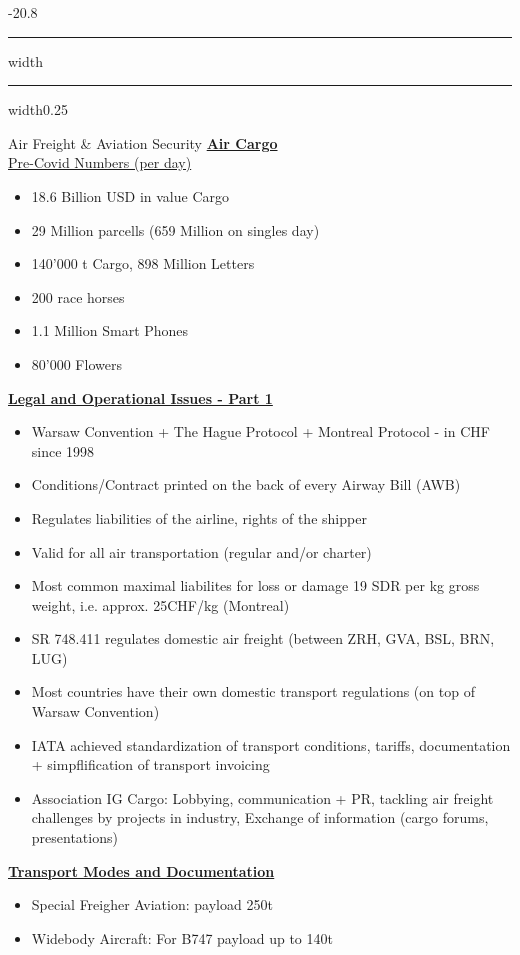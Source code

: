 \documentclass[9pt, landscape, fleqn]{scrartcl}
\makeatletter
\renewcommand{\section}{\@startsection{section}{1}{0mm}%
{-2\baselineskip}{0.8\baselineskip}%
{\hrule depth 0.2pt width\columnwidth\hrule depth1.5pt
width0.25\columnwidth\vspace*{1.2em}\Large\bfseries\rmfamily}}
\makeatother
\begin{document}
\begin{multicols*}{3}
\section{Air Freight \& Aviation Security}
\underline{\textbf{Air Cargo}} \\ 
\underline{Pre-Covid Numbers (per day)}
\begin{itemize}
    \item 18.6 Billion USD in value Cargo
    \item 29 Million parcells (659 Million on singles day)
    \item 140'000 t Cargo, 898 Million Letters 
    \item 200 race horses 
    \item 1.1 Million Smart Phones 
    \item 80'000 Flowers 
\end{itemize}
\underline{\textbf{Legal and Operational Issues - Part 1}}
\begin{itemize}
    \item Warsaw Convention + The Hague Protocol + Montreal Protocol - in CHF since 1998
    \item Conditions/Contract printed on the back of every Airway Bill (AWB)
    \item Regulates liabilities of the airline, rights of the shipper 
    \item Valid for all air transportation (regular and/or charter)
    \item Most common maximal liabilites for loss or damage 19 SDR per kg gross weight, i.e. approx. 25CHF/kg (Montreal)
    \item SR 748.411 regulates domestic air freight (between ZRH, GVA, BSL, BRN, LUG)
    \item Most countries have their own domestic transport regulations (on top of Warsaw Convention)
    \item IATA achieved standardization of transport conditions, tariffs, documentation + simpflification of transport invoicing
    \item Association IG Cargo: Lobbying, communication + PR, tackling air freight challenges by projects in industry, Exchange of information (cargo forums, presentations)
\end{itemize}
\underline{\textbf{Transport Modes and Documentation}}
\begin{itemize}
    \item Special Freigher Aviation: payload 250t 
    \item Widebody Aircraft: For B747 payload up to 140t 

\end{itemize}
\end{multicols*}
\end{document}
